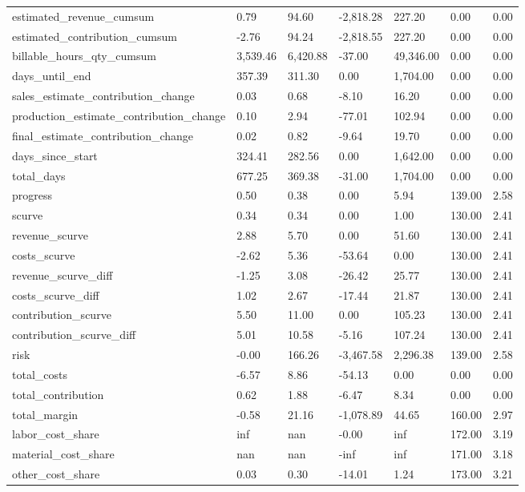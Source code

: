 \begin{landscape}
\begin{longtable}[h!]{lllllll}
estimated_revenue_cumsum & 0.79 & 94.60 & -2,818.28 & 227.20 & 0.00 & 0.00 \\
estimated_contribution_cumsum & -2.76 & 94.24 & -2,818.55 & 227.20 & 0.00 & 0.00 \\
billable_hours_qty_cumsum & 3,539.46 & 6,420.88 & -37.00 & 49,346.00 & 0.00 & 0.00 \\
days_until_end & 357.39 & 311.30 & 0.00 & 1,704.00 & 0.00 & 0.00 \\
sales_estimate_contribution_change & 0.03 & 0.68 & -8.10 & 16.20 & 0.00 & 0.00 \\
production_estimate_contribution_change & 0.10 & 2.94 & -77.01 & 102.94 & 0.00 & 0.00 \\
final_estimate_contribution_change & 0.02 & 0.82 & -9.64 & 19.70 & 0.00 & 0.00 \\
days_since_start & 324.41 & 282.56 & 0.00 & 1,642.00 & 0.00 & 0.00 \\
total_days & 677.25 & 369.38 & -31.00 & 1,704.00 & 0.00 & 0.00 \\
progress & 0.50 & 0.38 & 0.00 & 5.94 & 139.00 & 2.58 \\
scurve & 0.34 & 0.34 & 0.00 & 1.00 & 130.00 & 2.41 \\
revenue_scurve & 2.88 & 5.70 & 0.00 & 51.60 & 130.00 & 2.41 \\
costs_scurve & -2.62 & 5.36 & -53.64 & 0.00 & 130.00 & 2.41 \\
revenue_scurve_diff & -1.25 & 3.08 & -26.42 & 25.77 & 130.00 & 2.41 \\
costs_scurve_diff & 1.02 & 2.67 & -17.44 & 21.87 & 130.00 & 2.41 \\
contribution_scurve & 5.50 & 11.00 & 0.00 & 105.23 & 130.00 & 2.41 \\
contribution_scurve_diff & 5.01 & 10.58 & -5.16 & 107.24 & 130.00 & 2.41 \\
risk & -0.00 & 166.26 & -3,467.58 & 2,296.38 & 139.00 & 2.58 \\
total_costs & -6.57 & 8.86 & -54.13 & 0.00 & 0.00 & 0.00 \\
total_contribution & 0.62 & 1.88 & -6.47 & 8.34 & 0.00 & 0.00 \\
total_margin & -0.58 & 21.16 & -1,078.89 & 44.65 & 160.00 & 2.97 \\
labor_cost_share & inf & nan & -0.00 & inf & 172.00 & 3.19 \\
material_cost_share & nan & nan & -inf & inf & 171.00 & 3.18 \\
other_cost_share & 0.03 & 0.30 & -14.01 & 1.24 & 173.00 & 3.21 \\

\end{longtable}
\end{landscape}
